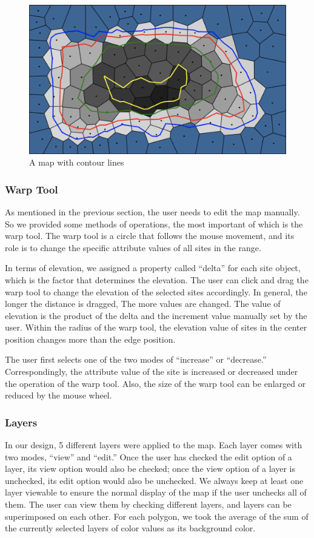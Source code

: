 \begin{figure}[htbp]
  \includegraphics[width=\textwidth]{section04/assets/Map-contourline.png}
  \caption{A map with contour lines}
  \label{fig:contour line}
\end{figure}

\subsubsection{Warp Tool}
As mentioned in the previous section, the user needs to edit the map manually. So we provided some methods of operations, the most important of which is the warp tool. The warp tool is a circle that follows the mouse movement, and its role is to change the specific attribute values of all sites in the range.

In terms of elevation, we assigned a property called ``delta'' for each site object, which is the factor that determines the elevation. The user can click and drag the warp tool to change the elevation of the selected sites accordingly. In general, the longer the distance is dragged, The more values are changed. The value of elevation is the product of the delta and the increment value manually set by the user. Within the radius of the warp tool, the elevation value of sites in the center position changes more than the edge position.

The user first selects one of the two modes of ``increase'' or ``decrease.'' Correspondingly, the attribute value of the site is increased or decreased under the operation of the warp tool. Also, the size of the warp tool can be enlarged or reduced by the mouse wheel.

\subsubsection{Layers}
In our design, 5 different layers were applied to the map. Each layer comes with two modes, ``view'' and ``edit.'' Once the user has checked the edit option of a layer, its view option would also be checked; once the view option of a layer is unchecked, its edit option would also be unchecked. We always keep at least one layer viewable to ensure the normal display of the map if the user unchecks all of them. The user can view them by checking different layers, and layers can be superimposed on each other. For each polygon, we took the average of the sum of the currently selected layers of color values as its background color.

